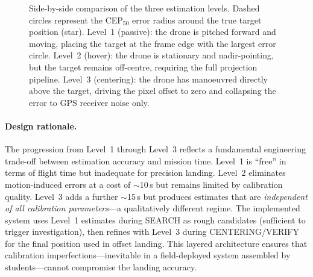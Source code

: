 \begin{figure}[H]
  \caption{Side-by-side comparison of the three estimation levels.  Dashed circles represent the CEP$_{50}$ error radius around the true target position (star).  Level~1 (passive): the drone is pitched forward and moving, placing the target at the frame edge with the largest error circle.  Level~2 (hover): the drone is stationary and nadir-pointing, but the target remains off-centre, requiring the full projection pipeline.  Level~3 (centering): the drone has manoeuvred directly above the target, driving the pixel offset to zero and collapsing the error to GPS receiver noise only.}
  \label{fig:three-level-comparison}
\end{figure}

\paragraph{Design rationale.}  The progression from Level~1 through Level~3 reflects a fundamental engineering trade-off between estimation accuracy and mission time.  Level~1 is ``free'' in terms of flight time but inadequate for precision landing.  Level~2 eliminates motion-induced errors at a cost of $\sim$10\,s but remains limited by calibration quality.  Level~3 adds a further $\sim$15\,s but produces estimates that are \emph{independent of all calibration parameters}---a qualitatively different regime.  The implemented system uses Level~1 estimates during SEARCH as rough candidates (sufficient to trigger investigation), then refines with Level~3 during CENTERING/VERIFY for the final position used in offset landing.  This layered architecture ensures that calibration imperfections---inevitable in a field-deployed system assembled by students---cannot compromise the landing accuracy.

